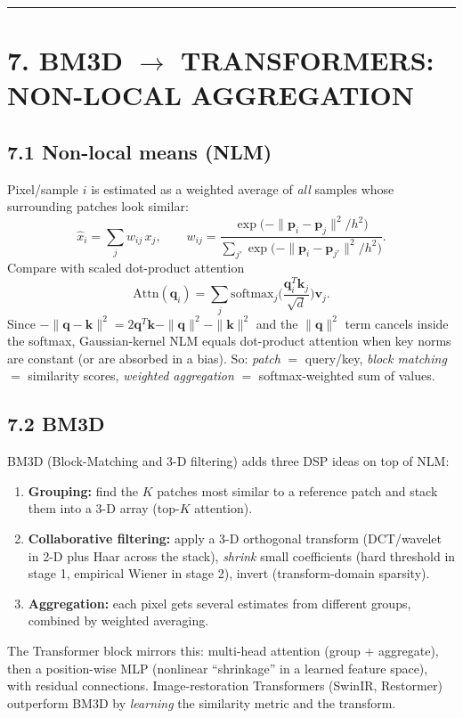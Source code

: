 \documentclass[11pt,a4paper]{article}
\begin{document}
\noindent\rule{\textwidth}{0.5pt}

\section{7. BM3D $\to$ TRANSFORMERS: NON-LOCAL AGGREGATION}

\subsection{7.1 Non-local means (NLM)}
Pixel/sample $i$ is estimated as a weighted average of \emph{all} samples whose surrounding patches look similar:
\begin{equation}
\hat{x}_i=\sum_j w_{ij}\,x_j,\qquad w_{ij}=\frac{\exp\!\big(-\|\mathbf{p}_i-\mathbf{p}_j\|^2/h^2\big)}{\sum_{j'}\exp\!\big(-\|\mathbf{p}_i-\mathbf{p}_{j'}\|^2/h^2\big)}.
\end{equation}
Compare with scaled dot-product attention
\begin{equation}
\mathrm{Attn}(\mathbf{q}_i)=\sum_j\mathrm{softmax}_j\!\Big(\frac{\mathbf{q}_i^T\mathbf{k}_j}{\sqrt{d}}\Big)\mathbf{v}_j.
\end{equation}
Since $-\|\mathbf{q}-\mathbf{k}\|^2 = 2\mathbf{q}^T\mathbf{k}-\|\mathbf{q}\|^2-\|\mathbf{k}\|^2$ and the $\|\mathbf{q}\|^2$ term cancels inside the softmax, Gaussian-kernel NLM equals dot-product attention when key norms are constant (or are absorbed in a bias). So: \emph{patch} $=$ query/key, \emph{block matching} $=$ similarity scores, \emph{weighted aggregation} $=$ softmax-weighted sum of values.

\subsection{7.2 BM3D}
BM3D (Block-Matching and 3-D filtering) adds three DSP ideas on top of NLM:
\begin{enumerate}
    \item \textbf{Grouping:} find the $K$ patches most similar to a reference patch and stack them into a 3-D array (top-$K$ attention).
    \item \textbf{Collaborative filtering:} apply a 3-D orthogonal transform (DCT/wavelet in 2-D plus Haar across the stack), \emph{shrink} small coefficients (hard threshold in stage 1, empirical Wiener in stage 2), invert (transform-domain sparsity).
    \item \textbf{Aggregation:} each pixel gets several estimates from different groups, combined by weighted averaging.
\end{enumerate}
The Transformer block mirrors this: multi-head attention (group + aggregate), then a position-wise MLP (nonlinear ``shrinkage'' in a learned feature space), with residual connections. Image-restoration Transformers (SwinIR, Restormer) outperform BM3D by \emph{learning} the similarity metric and the transform.
\end{document}
